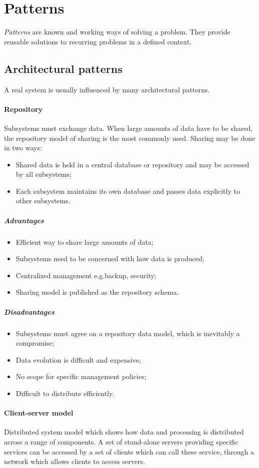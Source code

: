 \section{Patterns}
\emph{Patterns} are known and working ways of solving a problem. They provide reusable solutions to recurring problems in a defined context.

\subsection{Architectural patterns}
A real system is usually influenced by many architectural patterns.

\paragraph{Repository}
Subsystems must exchange data. When large amounts of data have to be shared, the repository model of sharing is the most commonly used. Sharing may be done in two ways:
\begin{itemize}
\item Shared data is held in a central database or repository and may be accessed by all subsystems;
\item Each subsystem maintains its own database and passes data explicitly to other subsystems.
\end{itemize}

\subparagraph{Advantages}
\begin{itemize}
\item Efficient way to share large amounts of data;
\item Subsystems need to be concerned with how data is produced;
\item Centralized management e.g.\@ backup, security;
\item Sharing model is published as the repository schema.
\end{itemize}

\subparagraph{Disadvantages}
\begin{itemize}
\item Subsystems must agree on a repository data model, which is inevitably a compromise;
\item Data evolution is difficult and expensive;
\item No scope for specific management policies;
\item Difficult to distribute efficiently.
\end{itemize}

\paragraph{Client-server model}
Distributed system model which shows how data and processing is distributed across a range of components. A set of stand-alone servers providing specific services can be accessed by a set of clients which can call these service, through a network which allows clients to access servers.

